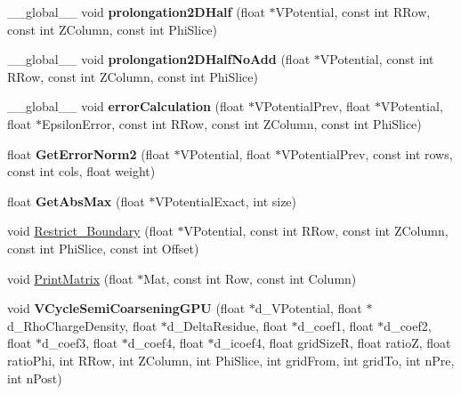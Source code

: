 \begin{DoxyCompactItemize}
\item 
\hypertarget{PoissonSolver3DGPU_8cu_ad39e3fa5c2547b51ede30cc489cbe1cd}{}\label{PoissonSolver3DGPU_8cu_ad39e3fa5c2547b51ede30cc489cbe1cd} 
\+\_\+\+\_\+global\+\_\+\+\_\+ void {\bfseries prolongation2\+D\+Half} (float $\ast$V\+Potential, const int R\+Row, const int Z\+Column, const int Phi\+Slice)
\item 
\hypertarget{PoissonSolver3DGPU_8cu_a3bfd3f6601aee313d79eceec81ac54a2}{}\label{PoissonSolver3DGPU_8cu_a3bfd3f6601aee313d79eceec81ac54a2} 
\+\_\+\+\_\+global\+\_\+\+\_\+ void {\bfseries prolongation2\+D\+Half\+No\+Add} (float $\ast$V\+Potential, const int R\+Row, const int Z\+Column, const int Phi\+Slice)
\item 
\hypertarget{PoissonSolver3DGPU_8cu_a8e66b4708f14a622db5dff6317c48eef}{}\label{PoissonSolver3DGPU_8cu_a8e66b4708f14a622db5dff6317c48eef} 
\+\_\+\+\_\+global\+\_\+\+\_\+ void {\bfseries error\+Calculation} (float $\ast$V\+Potential\+Prev, float $\ast$V\+Potential, float $\ast$Epsilon\+Error, const int R\+Row, const int Z\+Column, const int Phi\+Slice)
\item 
\hypertarget{PoissonSolver3DGPU_8cu_aa63aea02197f4ab9fddc71761568b5d4}{}\label{PoissonSolver3DGPU_8cu_aa63aea02197f4ab9fddc71761568b5d4} 
float {\bfseries Get\+Error\+Norm2} (float $\ast$V\+Potential, float $\ast$V\+Potential\+Prev, const int rows, const int cols, float weight)
\item 
\hypertarget{PoissonSolver3DGPU_8cu_aa26dfc9c29c286cfa54a539b131aecd7}{}\label{PoissonSolver3DGPU_8cu_aa26dfc9c29c286cfa54a539b131aecd7} 
float {\bfseries Get\+Abs\+Max} (float $\ast$V\+Potential\+Exact, int size)
\item 
void \hyperlink{PoissonSolver3DGPU_8cu_a1b6e721fb1d6d9d4155465f1af16c8aa}{Restrict\+\_\+\+Boundary} (float $\ast$V\+Potential, const int R\+Row, const int Z\+Column, const int Phi\+Slice, const int Offset)
\item 
void \hyperlink{PoissonSolver3DGPU_8cu_ae81f622f6c82ae791ba4bf486243c0e5}{Print\+Matrix} (float $\ast$Mat, const int Row, const int Column)
\item 
\hypertarget{PoissonSolver3DGPU_8cu_af1cb203004a7ed980bcf3fb0279db24f}{}\label{PoissonSolver3DGPU_8cu_af1cb203004a7ed980bcf3fb0279db24f} 
void {\bfseries V\+Cycle\+Semi\+Coarsening\+G\+PU} (float $\ast$d\+\_\+\+V\+Potential, float $\ast$d\+\_\+\+Rho\+Charge\+Density, float $\ast$d\+\_\+\+Delta\+Residue, float $\ast$d\+\_\+coef1, float $\ast$d\+\_\+coef2, float $\ast$d\+\_\+coef3, float $\ast$d\+\_\+coef4, float $\ast$d\+\_\+icoef4, float grid\+SizeR, float ratioZ, float ratio\+Phi, int R\+Row, int Z\+Column, int Phi\+Slice, int grid\+From, int grid\+To, int n\+Pre, int n\+Post)

\end{DoxyCompactItemize}
